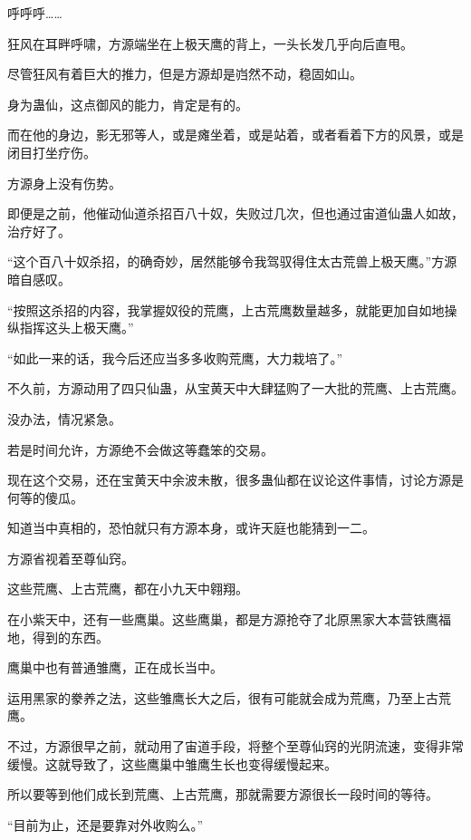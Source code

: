 
\begin{this_body}



呼呼呼……

狂风在耳畔呼啸，方源端坐在上极天鹰的背上，一头长发几乎向后直甩。

尽管狂风有着巨大的推力，但是方源却是岿然不动，稳固如山。

身为蛊仙，这点御风的能力，肯定是有的。

而在他的身边，影无邪等人，或是瘫坐着，或是站着，或者看着下方的风景，或是闭目打坐疗伤。

方源身上没有伤势。

即便是之前，他催动仙道杀招百八十奴，失败过几次，但也通过宙道仙蛊人如故，治疗好了。

“这个百八十奴杀招，的确奇妙，居然能够令我驾驭得住太古荒兽上极天鹰。”方源暗自感叹。

“按照这杀招的内容，我掌握奴役的荒鹰，上古荒鹰数量越多，就能更加自如地操纵指挥这头上极天鹰。”

“如此一来的话，我今后还应当多多收购荒鹰，大力栽培了。”

不久前，方源动用了四只仙蛊，从宝黄天中大肆猛购了一大批的荒鹰、上古荒鹰。

没办法，情况紧急。

若是时间允许，方源绝不会做这等蠢笨的交易。

现在这个交易，还在宝黄天中余波未散，很多蛊仙都在议论这件事情，讨论方源是何等的傻瓜。

知道当中真相的，恐怕就只有方源本身，或许天庭也能猜到一二。

方源省视着至尊仙窍。

这些荒鹰、上古荒鹰，都在小九天中翱翔。

在小紫天中，还有一些鹰巢。这些鹰巢，都是方源抢夺了北原黑家大本营铁鹰福地，得到的东西。

鹰巢中也有普通雏鹰，正在成长当中。

运用黑家的豢养之法，这些雏鹰长大之后，很有可能就会成为荒鹰，乃至上古荒鹰。

不过，方源很早之前，就动用了宙道手段，将整个至尊仙窍的光阴流速，变得非常缓慢。这就导致了，这些鹰巢中雏鹰生长也变得缓慢起来。

所以要等到他们成长到荒鹰、上古荒鹰，那就需要方源很长一段时间的等待。

“目前为止，还是要靠对外收购么。”


\end{this_body}

